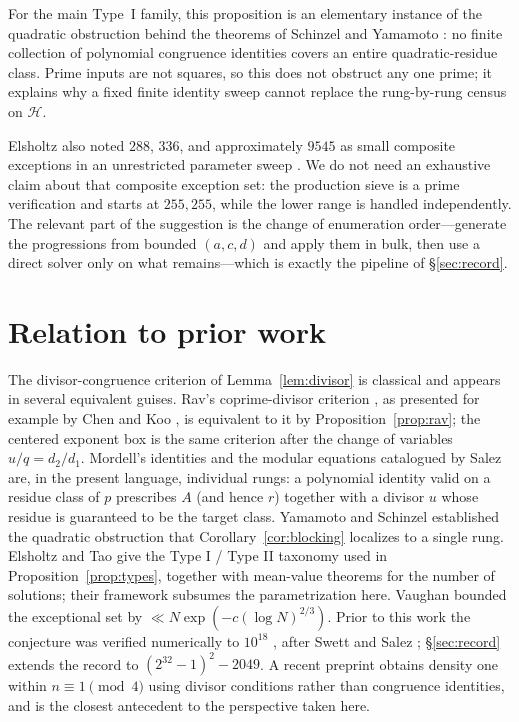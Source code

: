 \documentclass[11pt]{article}
\theoremstyle{definition}
\theoremstyle{remark}
\begin{document}
For the main Type~I family, this proposition is an elementary instance of the
quadratic obstruction behind the theorems of Schinzel and Yamamoto
\cite{Schinzel2000,Yamamoto1965}: no finite collection of polynomial congruence identities
covers an entire quadratic-residue class. Prime inputs are not squares, so this does
not obstruct any one prime; it explains why a fixed finite identity sweep cannot
replace the rung-by-rung census on $\mathcal H$.

Elsholtz also noted $288$, $336$, and approximately $9545$ as small composite
exceptions in an unrestricted parameter sweep \cite{ElsholtzPC2026}. We do not need an exhaustive claim
about that composite exception set: the production sieve is a prime verification and
starts at $255{,}255$, while the lower range is handled independently. The relevant
part of the suggestion is the change of enumeration order---generate the progressions
from bounded $(a,c,d)$ and apply them in bulk, then use a direct solver only on what
remains---which is exactly the pipeline of \S\ref{sec:record}.

\section{Relation to prior work}\label{sec:prior}

The divisor-congruence criterion of Lemma~\ref{lem:divisor} is classical and appears in
several equivalent guises. Rav's coprime-divisor criterion \cite{Rav1966}, as presented
for example by Chen and Koo \cite{ChenKoo2013}, is equivalent to it by
Proposition~\ref{prop:rav}; the centered exponent box is the same criterion after the
change of variables $u/q=d_2/d_1$. Mordell's identities \cite{Mordell1969} and the modular
equations catalogued by Salez \cite{Salez2014} are, in the present language, individual
rungs: a polynomial identity valid on a residue class of $p$ prescribes $A$ (and hence
$r$) together with a divisor $u$ whose residue is guaranteed to be the target class.
Yamamoto \cite{Yamamoto1965} and Schinzel \cite{Schinzel2000} established the
quadratic obstruction that Corollary~\ref{cor:blocking} localizes to a single rung.
Elsholtz and Tao \cite{ElsholtzTao2013} give the Type I / Type II taxonomy used in
Proposition~\ref{prop:types}, together with mean-value theorems for the number of
solutions; their framework subsumes the parametrization here. Vaughan \cite{Vaughan1970}
bounded the exceptional set by $\ll N\exp(-c(\log N)^{2/3})$. Prior to this work the
conjecture was verified numerically to $10^{18}$ \cite{MihneaBogdan2025}, after Swett
\cite{Swett1999} and Salez \cite{Salez2014}; \S\ref{sec:record} extends the record to
$(2^{32}-1)^2 - 2049$. A recent preprint \cite{Unified2026} obtains density one
within $n \equiv 1 \pmod 4$ using divisor conditions rather than congruence identities,
and is the closest antecedent to the perspective taken here.
\end{document}
